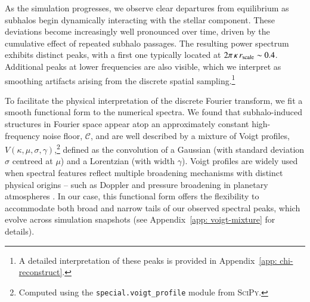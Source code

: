 \documentclass[fleqn,usenatbib]{mnras}
\newcommand{\JP}[1]{{\color{darkorange}#1}}
\begin{document}
As the simulation progresses, we observe clear departures from equilibrium as subhalos begin dynamically interacting with the stellar component. These deviations become increasingly well pronounced over time, driven by the cumulative effect of repeated subhalo passages. The resulting power spectrum exhibits distinct peaks, with a first one typically located at $2 \pi \, \kappa \, r_{\rm scale} \sim 0.4$. Additional peaks at lower frequencies are also visible, which we interpret as smoothing artifacts arising from the discrete spatial sampling.\footnote{A detailed interpretation of these peaks is provided in Appendix~\ref{app: chi-reconstruct}.}

To facilitate the physical interpretation of the discrete Fourier transform, we fit a smooth functional form to the numerical spectra. We found that subhalo-induced structures in Fourier space appear atop an approximately constant high-frequency noise floor, $\mathcal{C}$, and are well described by a mixture of Voigt profiles, $V(\kappa, \mu, \sigma, \gamma)$,\footnote{Computed using the \texttt{special.voigt\_profile} module from \textsc{SciPy}.} defined as the convolution of a Gaussian (with standard deviation $\sigma$ centreed at $\mu$) and a Lorentzian (with width $\gamma$). Voigt profiles are widely used when spectral features reflect multiple broadening mechanisms with distinct physical origins -- such as Doppler and pressure broadening in planetary atmospheres \citep[e.g.][]{Kuhn&London69}. In our case, this functional form offers the flexibility to accommodate both broad and narrow tails of our observed spectral peaks, which evolve across simulation snapshots (see Appendix~\ref{app: voigt-mixture} for details).
\end{document}
